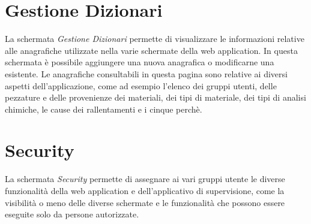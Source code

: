   \section{Gestione Dizionari}
  La schermata \textit{Gestione Dizionari} permette di visualizzare le informazioni relative
  alle anagrafiche utilizzate nella varie schermate della web application. In questa schermata è possibile aggiungere una nuova
  anagrafica o modificarne una esistente. Le anagrafiche consultabili in questa pagina sono relative ai diversi aspetti
  dell'applicazione, come ad esempio l'elenco dei gruppi utenti, delle pezzature e delle provenienze dei materiali, dei
  tipi di materiale, dei tipi di analisi chimiche, le cause dei rallentamenti e i cinque perchè.
  
  \section{Security}
  La schermata \textit{Security} permette di assegnare ai vari gruppi utente
  le diverse funzionalità della web application e dell'applicativo di supervisione, come la visibilità o meno delle
  diverse schermate e le funzionalità che possono essere eseguite solo da persone autorizzate.